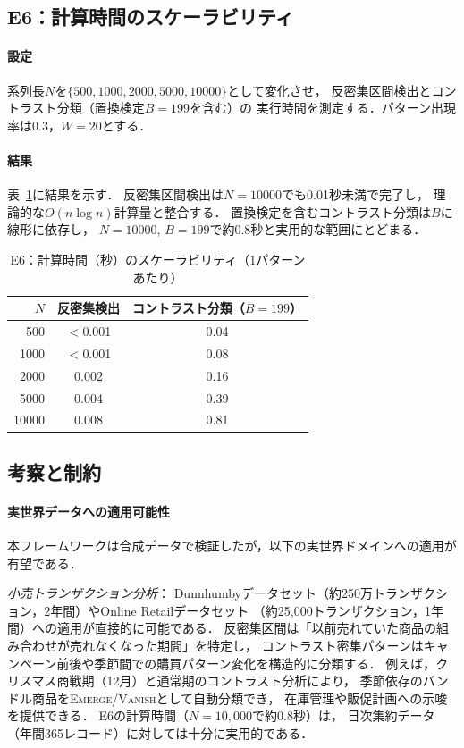\subsection{E6：計算時間のスケーラビリティ}

\paragraph{設定}
系列長$N$を$\{500, 1000, 2000, 5000, 10000\}$として変化させ，
反密集区間検出とコントラスト分類（置換検定$B = 199$を含む）の
実行時間を測定する．パターン出現率は0.3，$W = 20$とする．

\paragraph{結果}
表~\ref{tab:e6}に結果を示す．
反密集区間検出は$N = 10000$でも0.01秒未満で完了し，
理論的な$O(n \log n)$計算量と整合する．
置換検定を含むコントラスト分類は$B$に線形に依存し，
$N = 10000$, $B = 199$で約0.8秒と実用的な範囲にとどまる．

\begin{table}[t]
\centering
\caption{E6：計算時間（秒）のスケーラビリティ（1パターンあたり）}
\label{tab:e6}
\begin{tabular}{rcc}
\toprule
$N$ & 反密集検出 & コントラスト分類（$B=199$） \\
\midrule
500   & $<$0.001 & 0.04 \\
1000  & $<$0.001 & 0.08 \\
2000  & 0.002 & 0.16 \\
5000  & 0.004 & 0.39 \\
10000 & 0.008 & 0.81 \\
\bottomrule
\end{tabular}
\end{table}

\subsection{考察と制約}\label{sec:discussion}

\paragraph{実世界データへの適用可能性}
本フレームワークは合成データで検証したが，以下の実世界ドメインへの適用が有望である．

\emph{小売トランザクション分析}：
Dunnhumbyデータセット（約250万トランザクション，2年間）やOnline Retailデータセット
（約25,000トランザクション，1年間）への適用が直接的に可能である．
反密集区間は「以前売れていた商品の組み合わせが売れなくなった期間」を特定し，
コントラスト密集パターンはキャンペーン前後や季節間での購買パターン変化を構造的に分類する．
例えば，クリスマス商戦期（12月）と通常期のコントラスト分析により，
季節依存のバンドル商品を\textsc{Emerge}/\textsc{Vanish}として自動分類でき，
在庫管理や販促計画への示唆を提供できる．
E6の計算時間（$N = 10{,}000$で約0.8秒）は，
日次集約データ（年間365レコード）に対しては十分に実用的である．

